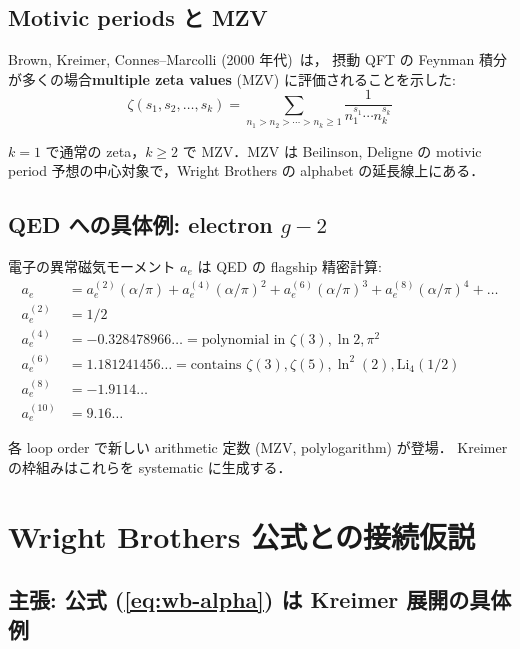 \documentclass[11pt,a4paper]{article}
\begin{document}
\subsection{Motivic periods と MZV}

Brown, Kreimer, Connes--Marcolli (2000 年代)~\cite{Brown2013, CM2004}は，
摂動 QFT の Feynman 積分が多くの場合\textbf{multiple zeta values}
(MZV) に評価されることを示した:
\begin{equation}
\zeta(s_1, s_2, \ldots, s_k) = \sum_{n_1 > n_2 > \cdots > n_k \geq 1}
\frac{1}{n_1^{s_1}\cdots n_k^{s_k}}
\end{equation}

$k = 1$ で通常の zeta，$k \geq 2$ で MZV．MZV は
Beilinson, Deligne の motivic period 予想の中心対象で，Wright
Brothers の alphabet の延長線上にある．

\subsection{QED への具体例: electron $g-2$}

電子の異常磁気モーメント $a_e$ は QED の flagship 精密計算:
\begin{align}
a_e &= a_e^{(2)} (\alpha/\pi) + a_e^{(4)} (\alpha/\pi)^2 + a_e^{(6)} (\alpha/\pi)^3 + a_e^{(8)} (\alpha/\pi)^4 + \ldots\\
a_e^{(2)} &= 1/2\\
a_e^{(4)} &= -0.328478966\ldots = \text{polynomial in }\zeta(3), \ln 2, \pi^2\\
a_e^{(6)} &= 1.181241456\ldots = \text{contains }\zeta(3), \zeta(5), \ln^2(2), \text{Li}_4(1/2)\\
a_e^{(8)} &= -1.9114 \ldots\\
a_e^{(10)} &= 9.16 \ldots
\end{align}

各 loop order で新しい arithmetic 定数 (MZV, polylogarithm) が登場．
Kreimer の枠組みはこれらを systematic に生成する．

\section{Wright Brothers 公式との接続仮説}

\subsection{主張: 公式 (\ref{eq:wb-alpha}) は Kreimer 展開の具体例}
\end{document}
